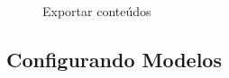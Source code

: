 \begin{figure}[htbp]
 \begin{center}
  \caption{Exportar conteúdos}
  \label{fig:cap5_7}
 \end{center}
\end{figure}

\subsection{Configurando Modelos}

